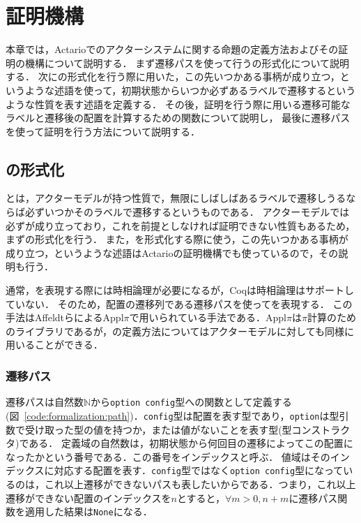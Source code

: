\chapter{証明機構}
\label{chapter:proof}

本章では，Actarioでのアクターシステムに関する命題の定義方法およびその証明の機構について説明する．
まず遷移パスを使って行う\fairness の形式化について説明する．
次に\fairness の形式化を行う際に用いた，この先いつかある事柄が成り立つ，というような述語を使って，初期状態からいつか必ずあるラベルで遷移するというような性質を表す述語を定義する．
その後，証明を行う際に用いる遷移可能なラベルと遷移後の配置を計算するための関数について説明し，
最後に遷移パスを使って証明を行う方法について説明する．

\section{\fairness の形式化}
\fairness とは，アクターモデルが持つ性質で，無限にしばしばあるラベルで遷移しうるならば必ずいつかそのラベルで遷移するというものである．
アクターモデルでは必ず\fairness が成り立っており，これを前提としなければ証明できない性質もあるため，まず\fairness の形式化を行う．
また，\fairness を形式化する際に使う，この先いつかある事柄が成り立つ，というような述語はActarioの証明機構でも使っているので，その説明も行う．

通常，\fairness を表現する際には時相論理が必要になるが，Coqは時相論理はサポートしていない．
そのため，配置の遷移列である遷移パスを使って\fairness を表現する．
この手法はAffeldtらによるAppl$\pi$\cite{Affeldt200817}で用いられている手法である．Appl$\pi$は$\pi$計算のためのライブラリであるが，\fairness の定義方法についてはアクターモデルに対しても同様に用いることができる．

\subsection{遷移パス}
遷移パスは自然数$\mathbb{N}$から\texttt{option config}型への関数として定義する (図~\ref{code:formalization:path})．\texttt{config}型は配置を表す型であり，\texttt{option}は型引数で受け取った型の値を持つか，または値がないことを表す型(型コンストラクタ)である．
定義域の自然数は，初期状態から何回目の遷移によってこの配置になったかという番号である．この番号をインデックスと呼ぶ．
値域はそのインデックスに対応する配置を表す．\texttt{config}型ではなく\texttt{option config}型になっているのは，これ以上遷移ができないパスも表したいからである．つまり，これ以上遷移ができない配置のインデックスを$n$とすると，$\forall m > 0, n + m$に遷移パス関数を適用した結果は\texttt{None}になる．

